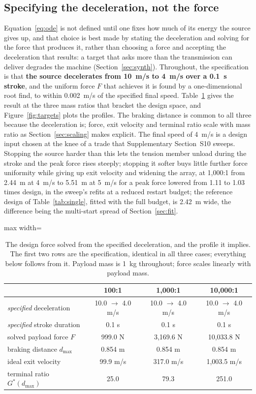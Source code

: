 \documentclass[preprint,12pt,number]{elsarticle}
\newcommand{\Gstar}{G^{*}}
\newcommand{\dmax}{d_{\max}}
\begin{document}
\subsection{Specifying the deceleration, not the force}

Equation~\eqref{eq:ode} is not defined until one fixes how much of its energy the source gives up, and that choice is best made by stating the deceleration and solving for the force that produces it, rather than choosing a force and accepting the deceleration that results: a target that asks more than the transmission can deliver degrades the machine (Section~\ref{sec:synth}). Throughout, the specification is that \textbf{the source decelerates from 10~m/s to 4~m/s over a 0.1~s stroke}, and the uniform force $F$ that achieves it is found by a one-dimensional root find, to within 0.002~m/s of the specified final speed. Table~\ref{tab:spec} gives the result at the three mass ratios that bracket the design space, and Figure~\ref{fig:targets} plots the profiles. The braking distance is common to all three because the deceleration is; force, exit velocity and terminal ratio scale with mass ratio as Section~\ref{sec:scaling} makes explicit. The final speed of 4~m/s is a design input chosen at the knee of a trade that Supplementary Section~S10 sweeps. Stopping the source harder than this lets the tension member unload during the stroke and the peak force rises steeply; stopping it softer buys little further force uniformity while giving up exit velocity and widening the array, at 1,000:1 from 2.44~m at 4~m/s to 5.51~m at 5~m/s for a peak force lowered from 1.11 to 1.03 times design, in the sweep's refits at a reduced restart budget; the reference design of Table~\ref{tab:single}, fitted with the full budget, is 2.42~m wide, the difference being the multi-start spread of Section~\ref{sec:fit}.

\begin{table}[H]
\centering
\caption{The design force solved from the specified deceleration, and the profile it implies. The first two rows are the specification, identical in all three cases; everything below follows from it. Payload mass is 1~kg throughout; force scales linearly with payload mass.}
\label{tab:spec}
\begin{adjustbox}{max width=\linewidth}
\begin{tabular}{lccc}
\toprule
 & 100:1 & 1,000:1 & 10,000:1 \\
\midrule
\emph{specified} deceleration & 10.0 $\to$ 4.0 m/s & 10.0 $\to$ 4.0 m/s & 10.0 $\to$ 4.0 m/s \\
\emph{specified} stroke duration & 0.1 s & 0.1 s & 0.1 s \\
solved payload force $F$ & 999.0 N & 3,169.6 N & 10,033.8 N \\
braking distance $\dmax$ & 0.854 m & 0.854 m & 0.854 m \\
ideal exit velocity & 99.9 m/s & 317.0 m/s & 1,003.5 m/s \\
terminal ratio $\Gstar(\dmax)$ & 25.0 & 79.3 & 251.0 \\
\bottomrule
\end{tabular}
\end{adjustbox}
\end{table}
\end{document}

